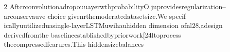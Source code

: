 \documentclass{article}
\begin{document}
\begin{paracol}{2}
AftcrconvolutionadropouuayerwthprobabilityO.juprovidesregularization--arconservauve
choice givenrthemoderatedatasetsize.We specif
icallyuutilizeduasingle-layerLSTMuwihauhidden dimension ofnl28,adesign derivedfromthe
baselineestablishedbypriorwork[24ltoprocess
thecompressedfearures.This-hiddensizebalances

\end{paracol}
\end{document}
